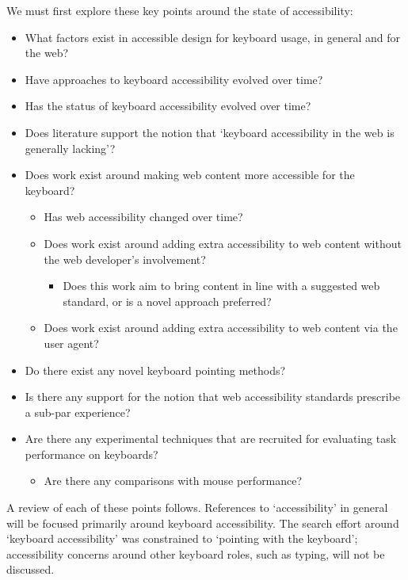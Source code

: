 \documentclass[11pt,openright,a4paper]{report}
\begin{document}
We must first explore these key points around the state of accessibility:
\begin{itemize}
\item What factors exist in accessible design for keyboard usage, in general and for the web?
\item Have approaches to keyboard accessibility evolved over time?
\item Has the status of keyboard accessibility evolved over time?
\item Does literature support the notion that `keyboard accessibility in the web is generally lacking'?
\item Does work exist around making web content more accessible for the keyboard?
\begin{itemize}
\item Has web accessibility changed over time?
\item Does work exist around adding extra accessibility to web content without the web developer's involvement?
\begin{itemize}
\item Does this work aim to bring content in line with a suggested web standard, or is a novel approach preferred?
\end{itemize}
\item Does work exist around adding extra accessibility to web content via the user agent?
\end{itemize}
\item Do there exist any novel keyboard pointing methods?
\item Is there any support for the notion that web accessibility standards prescribe a sub-par experience?
\item Are there any experimental techniques that are recruited for evaluating task performance on keyboards?
\begin{itemize}
\item Are there any comparisons with mouse performance?
\end{itemize}
\end{itemize}

A review of each of these points follows. References to `accessibility' in general will be focused primarily around keyboard accessibility. The search effort around `keyboard accessibility' was constrained to `pointing with the keyboard'; accessibility concerns around other keyboard roles, such as typing, will not be discussed.
\end{document}
